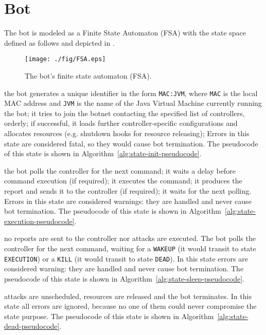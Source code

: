 \section{Bot}
\label{sec:bot}

The bot is modeled as a Finite State Automaton (FSA) with the state space defined as follows and depicted in .

\begin{figure}[tp]
  \centering
  \texttt{[image: ./fig/FSA.eps]}
  \caption{The bot's finite state automaton (FSA).}
    \label{fig:bot-fsa}
\end{figure}

\begin{description}
  \setlength\itemsep{1em}

  \item[INIT] the bot generates a unique identifier in the form \texttt{MAC:JVM}, where \texttt{MAC} is the local MAC address and \texttt{JVM} is the name of the Java Virtual Machine currently running the bot; it tries to join the botnet contacting the specified list of controllers, orderly; if successful, it loads further controller-specific configurations and allocates resources (e.g. shutdown hooks for resource releasing);
  Errors in this state are considered fatal, so they would cause bot termination. The pseudocode of this state is shown in Algorithm~\ref{alg:state-init-pseudocode}.

  \item[EXECUTION] the bot polls the controller for the next command; it waits a delay before command execution (if required); it executes the command; it produces the report and sends it to the controller (if required); it waits for the next polling.
  Errors in this state are considered warnings: they are handled and never cause bot termination. The pseudocode of this state is shown in Algorithm~\ref{alg:state-execution-pseudocode}.

  \item[SLEEP] no reports are sent to the controller nor attacks are executed. The bot polls the controller for the next command, waiting for a \texttt{WAKEUP} (it would transit to state \texttt{EXECUTION}) or a \texttt{KILL} (it would transit to state \texttt{DEAD}).
  In this state errors are considered warning: they are handled and never cause bot termination. The pseudocode of this state is shown in Algorithm~\ref{alg:state-sleep-pseudocode}.

  \item[DEAD] attacks are unscheduled, resources are released and the bot terminates. In this state all errors are ignored, because no one of them could never compromise the state purpose. The pseudocode of this state is shown in Algorithm~\ref{alg:state-dead-pseudocode}.

\end{description}

